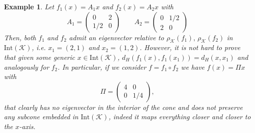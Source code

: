 \documentclass{article}
\newtheorem{example}[theorem]{Example}
\newcommand{\cradius}{\rho_{\cone}}
\newcommand{\cone}{\mathcal{K}}
\newcommand{\interior}{\mathrm{Int}}
\newcommand{\dist}{d_H}
\begin{document}
\begin{example}
    Let $f_1(x)=A_1x$ and $f_2(x)=A_2x$ with 
    \begin{equation}
        A_1=\begin{pmatrix}
            0 & 2\\
            1/2 & 0
        \end{pmatrix}\qquad A_2=\begin{pmatrix}
            0 & 1/2\\
            2 & 0
        \end{pmatrix}
    \end{equation}
Then, both $f_1$ and $f_2$ admit an eigenvector relative to $\cradius(f_1),\, \cradius(f_2)$ in $\interior(\cone)$, i.e. $x_1=(2,1)$ and $x_2=(1,2)$. However, it is not hard to prove that given some generic $x\in \interior(\cone)$, $\dist(f_1(x),f_1(x_1))=\dist(x,x_1)$ and analogously for $f_2$. In particular, if we consider 
$f=f_1\circ f_2$ we have $f(x)=\Pi x$ with 
\begin{equation}
    \Pi=\begin{pmatrix}
        4 & 0 \\
        0 & 1/4
    \end{pmatrix},
\end{equation}
 that clearly has no eigenvector in the interior of the cone and does not preserve any subcone embedded in $\interior(\cone)$, indeed it maps everything closer and closer to the $x$-axis.  
\end{example}
\end{document}
